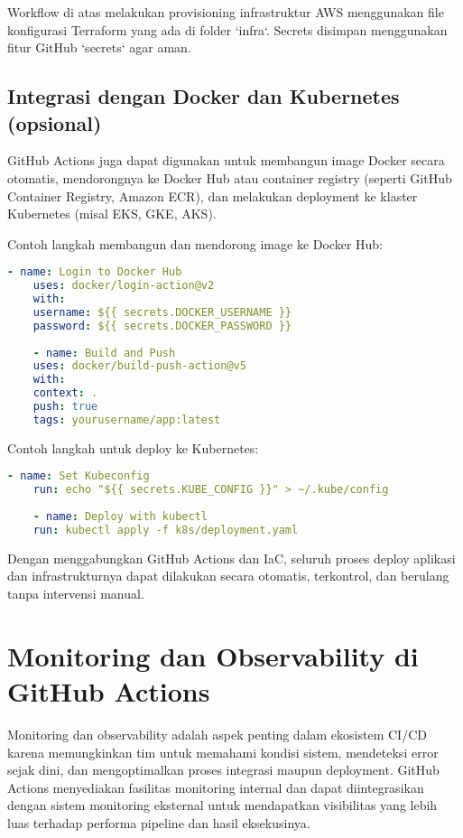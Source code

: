Workflow di atas melakukan provisioning infrastruktur AWS menggunakan file konfigurasi Terraform yang ada di folder `infra`. Secrets disimpan menggunakan fitur GitHub `secrets` agar aman.

\subsection{Integrasi dengan Docker dan Kubernetes (opsional)}

GitHub Actions juga dapat digunakan untuk membangun image Docker secara otomatis, mendorongnya ke Docker Hub atau container registry (seperti GitHub Container Registry, Amazon ECR), dan melakukan deployment ke klaster Kubernetes (misal EKS, GKE, AKS).

Contoh langkah membangun dan mendorong image ke Docker Hub:
\begin{lstlisting}[language=yaml, caption={Build dan Push Docker Image}]
	- name: Login to Docker Hub
	uses: docker/login-action@v2
	with:
	username: ${{ secrets.DOCKER_USERNAME }}
	password: ${{ secrets.DOCKER_PASSWORD }}
	
	- name: Build and Push
	uses: docker/build-push-action@v5
	with:
	context: .
	push: true
	tags: yourusername/app:latest
\end{lstlisting}

Contoh langkah untuk deploy ke Kubernetes:
\begin{lstlisting}[language=yaml, caption={Deploy ke Kubernetes}]
	- name: Set Kubeconfig
	run: echo "${{ secrets.KUBE_CONFIG }}" > ~/.kube/config
	
	- name: Deploy with kubectl
	run: kubectl apply -f k8s/deployment.yaml
\end{lstlisting}

Dengan menggabungkan GitHub Actions dan IaC, seluruh proses deploy aplikasi dan infrastrukturnya dapat dilakukan secara otomatis, terkontrol, dan berulang tanpa intervensi manual.

\section{Monitoring dan Observability di GitHub Actions}

Monitoring dan observability adalah aspek penting dalam ekosistem CI/CD karena memungkinkan tim untuk memahami kondisi sistem, mendeteksi error sejak dini, dan mengoptimalkan proses integrasi maupun deployment. GitHub Actions menyediakan fasilitas monitoring internal dan dapat diintegrasikan dengan sistem monitoring eksternal untuk mendapatkan visibilitas yang lebih luas terhadap performa pipeline dan hasil eksekusinya.

